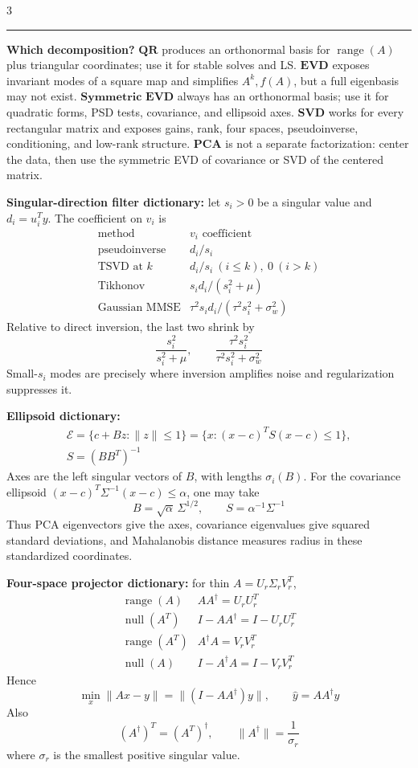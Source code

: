 \documentclass[10pt]{article}
\newcommand{\sect}[1]{\vspace{0.9pt}{\fontsize{7.2}{7.5}\selectfont\textbf{#1}}\vspace{0.25pt}\hrule\vspace{0.8pt}}
\newcommand{\sub}[1]{\textbf{#1}}
\newcommand{\range}{\operatorname{range}}
\newcommand{\nullsp}{\operatorname{null}}
\begin{document}
\begin{multicols*}{3}
\sect{Decomposition and Model Dictionaries}
\sub{Which decomposition?}
\(\textbf{QR}\) produces an orthonormal basis for \(\range(A)\) plus
triangular coordinates; use it for stable solves and LS.
\(\textbf{EVD}\) exposes invariant modes of a square map and simplifies
\(A^k,f(A)\), but a full eigenbasis may not exist.
\(\textbf{Symmetric EVD}\) always has an orthonormal basis; use it for
quadratic forms, PSD tests, covariance, and ellipsoid axes.
\(\textbf{SVD}\) works for every rectangular matrix and exposes gains,
rank, four spaces, pseudoinverse, conditioning, and low-rank structure.
\(\textbf{PCA}\) is not a separate factorization: center the data, then
use the symmetric EVD of covariance or SVD of the centered matrix.

\sub{Singular-direction filter dictionary:} let \(s_i>0\) be a singular
value and \(d_i=u_i^Ty\). The coefficient on \(v_i\) is
\[
\begin{array}{c|c}
\text{method}&v_i\text{ coefficient}\\ \hline
\text{pseudoinverse}&d_i/s_i\\
\text{TSVD at }k&d_i/s_i\ (i\le k),\ 0\ (i>k)\\
\text{Tikhonov}&s_i d_i/(s_i^2+\mu)\\
\text{Gaussian MMSE}&\tau^2s_i d_i/(\tau^2s_i^2+\sigma_w^2)
\end{array}
\]
Relative to direct inversion, the last two shrink by
\[
\frac{s_i^2}{s_i^2+\mu},\qquad
\frac{\tau^2s_i^2}{\tau^2s_i^2+\sigma_w^2}
\]
Small-\(s_i\) modes are precisely where inversion amplifies noise and
regularization suppresses it.

\sub{Ellipsoid dictionary:}
\[
\begin{gathered}
\mathcal E=\{c+Bz:\|z\|\le1\}
=\{x:(x-c)^TS(x-c)\le1\},\\
S=(BB^T)^{-1}
\end{gathered}
\]
Axes are the left singular vectors of \(B\), with lengths
\(\sigma_i(B)\). For the covariance ellipsoid
\((x-c)^T\Sigma^{-1}(x-c)\le\alpha\), one may take
\[
B=\sqrt\alpha\,\Sigma^{1/2},\qquad
S=\alpha^{-1}\Sigma^{-1}
\]
Thus PCA eigenvectors give the axes, covariance eigenvalues give squared
standard deviations, and Mahalanobis distance measures radius in these
standardized coordinates.

\sub{Four-space projector dictionary:} for thin
\(A=U_r\Sigma_rV_r^T\),
\[
\begin{array}{c|c}
\range(A)&AA^\dagger=U_rU_r^T\\
\nullsp(A^T)&I-AA^\dagger=I-U_rU_r^T\\
\range(A^T)&A^\dagger A=V_rV_r^T\\
\nullsp(A)&I-A^\dagger A=I-V_rV_r^T
\end{array}
\]
Hence
\[
\min_x\|Ax-y\|=\|(I-AA^\dagger)y\|,\qquad
\hat y=AA^\dagger y
\]
Also
\[
(A^\dagger)^T=(A^T)^\dagger,\qquad
\|A^\dagger\|=\frac1{\sigma_r}
\]
where \(\sigma_r\) is the smallest positive singular value.


\end{multicols*}
\end{document}
